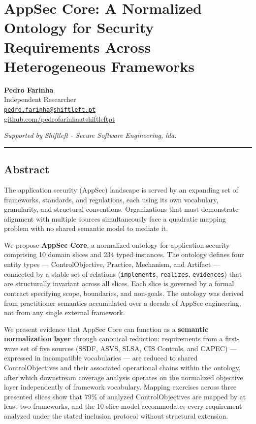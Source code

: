 \documentclass[
]{article}
\author{}
\date{}
\begin{document}
\section{AppSec Core: A Normalized Ontology for Security Requirements
Across Heterogeneous
Frameworks}\label{appsec-core-a-normalized-ontology-for-security-requirements-across-heterogeneous-frameworks}

\textbf{Pedro Farinha}\\
Independent Researcher\\
\href{mailto:pedro.farinha@shiftleft.pt}{\nolinkurl{pedro.farinha@shiftleft.pt}}\\
\href{https://github.com/pedrofarinhaatshiftleftpt}{github.com/pedrofarinhaatshiftleftpt}

\emph{Supported by Shiftleft - Secure Software Engineering, lda.}

\begin{center}\rule{0.5\linewidth}{0.5pt}\end{center}

\subsection{Abstract}\label{abstract}

The application security (AppSec) landscape is served by an expanding
set of frameworks, standards, and regulations, each using its own
vocabulary, granularity, and structural conventions. Organizations that
must demonstrate alignment with multiple sources simultaneously face a
quadratic mapping problem with no shared semantic model to mediate it.

We propose \textbf{AppSec Core}, a normalized ontology for application
security comprising 10 domain slices and 234 typed instances. The
ontology defines four entity types --- ControlObjective, Practice,
Mechanism, and Artifact --- connected by a stable set of relations
(\texttt{implements}, \texttt{realizes}, \texttt{evidences}) that are
structurally invariant across all slices. Each slice is governed by a
formal contract specifying scope, boundaries, and non-goals. The
ontology was derived from practitioner semantics accumulated over a
decade of AppSec engineering, not from any single external framework.

We present evidence that AppSec Core can function as a \textbf{semantic
normalization layer} through canonical reduction: requirements from a
first-wave set of five sources (SSDF, ASVS, SLSA, CIS Controls, and
CAPEC) --- expressed in incompatible vocabularies --- are reduced to
shared ControlObjectives and their associated operational chains within
the ontology, after which downstream coverage analysis operates on the
normalized objective layer independently of framework vocabulary.
Mapping exercises across three presented slices show that 79\% of
analyzed ControlObjectives are mapped by at least two frameworks, and
the 10-slice model accommodates every requirement analyzed under the
stated inclusion protocol without structural extension.
\end{document}
